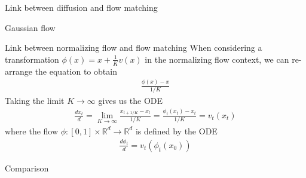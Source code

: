 \documentclass{beamer}
\begin{document}
\begin{frame}{Link between diffusion and flow matching}
    \begin{block}{Gaussian flow}

        
    \end{block}
\end{frame}

\begin{frame}{Link between normalizing flow and flow matching}
    When considering a transformation \(\phi(x)=x+\frac{1}{K}v(x)\) in the normalizing flow context, we can re-arrange the equation to obtain
    \begin{align*}
        \frac{\phi(x)-x}{1/K}
    \end{align*}
    Taking the limit \(K\rightarrow \infty\) gives us the ODE
    \begin{align*}
        \frac{dx_t}{d}=\lim_{K\rightarrow \infty}\frac{x_{t+1/K}-x_t}{1/K}=\frac{\phi_t(x_t)-x_t}{1/K}=v_t(x_t)
    \end{align*} 
    where the flow \( \phi:[0,1]\times\mathbb{R}^d\rightarrow\mathbb{R}^d\) is defined by the ODE
    \begin{align*}
        \frac{d\phi_t}{d}=v_t(\phi_t(x_0))
    \end{align*}
\end{frame}

\begin{frame}{Comparison}
\end{frame}
\end{document}
